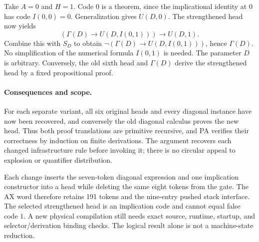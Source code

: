 Take $A=0$ and $H=1$. Code $0$ is a theorem, since the implicational
identity at $0$ has code $I(0,0)=0$. Generalization gives $U(D,0)$.
The strengthened head now yields
\[
 (\Gamma(D)\to U(D,I(0,1)))\to U(D,1).
\]
Combine this with $S_D$ to obtain
$\neg(\Gamma(D)\to U(D,I(0,1)))$, hence $\Gamma(D)$. No simplification
of the numerical formula $I(0,1)$ is needed. The parameter $D$ is arbitrary.
Conversely, the old sixth head and $\Gamma(D)$ derive the strengthened
head by a fixed propositional proof.

\paragraph{Consequences and scope.}
For each separate variant, all six original heads and every diagonal
instance have now been recovered, and conversely the old diagonal calculus
proves the new head. Thus both proof translations are primitive recursive,
and PA verifies their correctness by induction on finite derivations.
The argument recovers each changed infrastructure rule before invoking it;
there is no circular appeal to explosion or quantifier distribution.

Each change inserts the seven-token diagonal expression and one implication
constructor into a head while deleting the same eight tokens from the gate.
The AX word therefore retains 191 tokens and the nine-entry pushed stack
interface. The selected strengthened head is an implication code and cannot
equal false code $1$. A new physical compilation still needs exact source,
runtime, startup, and selector/derivation binding checks. The logical result
alone is not a machine-state reduction.
